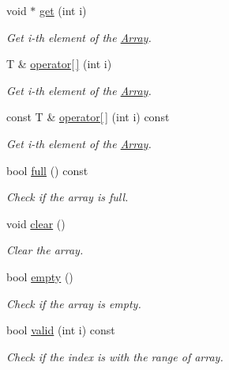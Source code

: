 \begin{DoxyCompactItemize}
\item 
void $\ast$ \hyperlink{class_magnum_1_1_array_ac6abfec70dbed68cb43e1ddce217adb3}{get} (int i)
\begin{DoxyCompactList}\small\item\em Get i-\/th element of the \hyperlink{class_magnum_1_1_array}{Array}. \end{DoxyCompactList}\item 
T \& \hyperlink{class_magnum_1_1_array_ac65ba513a2f2e754e9a735337a97514f}{operator\mbox{[}$\,$\mbox{]}} (int i)
\begin{DoxyCompactList}\small\item\em Get i-\/th element of the \hyperlink{class_magnum_1_1_array}{Array}. \end{DoxyCompactList}\item 
const T \& \hyperlink{class_magnum_1_1_array_aebd649285fc2333239d387d3cd475d82}{operator\mbox{[}$\,$\mbox{]}} (int i) const 
\begin{DoxyCompactList}\small\item\em Get i-\/th element of the \hyperlink{class_magnum_1_1_array}{Array}. \end{DoxyCompactList}\item 
bool \hyperlink{class_magnum_1_1_array_a21cbbac74657541e420b8b2ab62a5b7e}{full} () const 
\begin{DoxyCompactList}\small\item\em Check if the array is full. \end{DoxyCompactList}\item 
void \hyperlink{class_magnum_1_1_array_ac1aced1f3b927aaa3c4f685980785cfc}{clear} ()
\begin{DoxyCompactList}\small\item\em Clear the array. \end{DoxyCompactList}\item 
bool \hyperlink{class_magnum_1_1_array_a4b74a8d353ba59ce42e1165f3b3c8021}{empty} ()
\begin{DoxyCompactList}\small\item\em Check if the array is empty. \end{DoxyCompactList}\item 
bool \hyperlink{class_magnum_1_1_array_af71c6a4a87cd0d359551fe9ea304668e}{valid} (int i) const 
\begin{DoxyCompactList}\small\item\em Check if the index is with the range of array. \end{DoxyCompactList}\item 

\end{DoxyCompactItemize}
